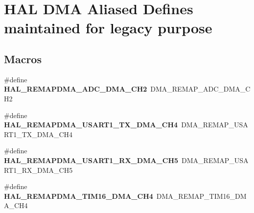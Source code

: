 \hypertarget{group___h_a_l___d_m_a___aliased___defines}{}\section{H\+AL D\+MA Aliased Defines maintained for legacy purpose}
\label{group___h_a_l___d_m_a___aliased___defines}
\subsection*{Macros}
\begin{DoxyCompactItemize}
\item 
\mbox{\label{group___h_a_l___d_m_a___aliased___defines_gab67dabe51720b5e84e798243b52428c7}} 
\#define {\bfseries H\+A\+L\+\_\+\+R\+E\+M\+A\+P\+D\+M\+A\+\_\+\+A\+D\+C\+\_\+\+D\+M\+A\+\_\+\+C\+H2}~D\+M\+A\+\_\+\+R\+E\+M\+A\+P\+\_\+\+A\+D\+C\+\_\+\+D\+M\+A\+\_\+\+C\+H2
\item 
\mbox{\label{group___h_a_l___d_m_a___aliased___defines_ga9f990969f0752e658ca3b1ca5fef46b8}} 
\#define {\bfseries H\+A\+L\+\_\+\+R\+E\+M\+A\+P\+D\+M\+A\+\_\+\+U\+S\+A\+R\+T1\+\_\+\+T\+X\+\_\+\+D\+M\+A\+\_\+\+C\+H4}~D\+M\+A\+\_\+\+R\+E\+M\+A\+P\+\_\+\+U\+S\+A\+R\+T1\+\_\+\+T\+X\+\_\+\+D\+M\+A\+\_\+\+C\+H4
\item 
\mbox{\label{group___h_a_l___d_m_a___aliased___defines_gaee098de174f870c95b0853e34dddd92b}} 
\#define {\bfseries H\+A\+L\+\_\+\+R\+E\+M\+A\+P\+D\+M\+A\+\_\+\+U\+S\+A\+R\+T1\+\_\+\+R\+X\+\_\+\+D\+M\+A\+\_\+\+C\+H5}~D\+M\+A\+\_\+\+R\+E\+M\+A\+P\+\_\+\+U\+S\+A\+R\+T1\+\_\+\+R\+X\+\_\+\+D\+M\+A\+\_\+\+C\+H5
\item 
\mbox{\label{group___h_a_l___d_m_a___aliased___defines_ga4ff45d813656296b6f9226f333a22fc3}} 
\#define {\bfseries H\+A\+L\+\_\+\+R\+E\+M\+A\+P\+D\+M\+A\+\_\+\+T\+I\+M16\+\_\+\+D\+M\+A\+\_\+\+C\+H4}~D\+M\+A\+\_\+\+R\+E\+M\+A\+P\+\_\+\+T\+I\+M16\+\_\+\+D\+M\+A\+\_\+\+C\+H4
\item 
\mbox{\label{group___h_a_l___d_m_a___aliased___defines_ga4f0dcd990b13d8fd3de0ed0bfd6be555}} 

\end{DoxyCompactItemize}
